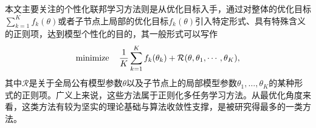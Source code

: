本文主要关注的个性化联邦学习方法则是从优化目标入手，通过对整体的优化目标$\sum\limits_{k=1}^K f_k(\theta)$或者子节点上局部的优化目标$f_k(\theta)$引入特定形式、具有特殊含义的正则项，达到模型个性化的目的\cite{hanzely2020federated,t2020pfedme,deng2020_apfl,dinh2021fedu,li2021pfedmac,li_2021_ditto,acar2021feddyn}，其一般形式可以写作
\begin{equation}
\label{eq:pfl-general}
\operatorname*{minimize} \quad \frac{1}{K}\sum\limits_{k=1}^K f_k(\theta_k) + \mathcal{R}(\theta, \theta_1, \cdots, \theta_K),
\end{equation}
其中$\mathcal{R}$是关于全局公有模型参数$\theta$以及子节点上的局部模型参数$\theta_1, \ldots, \theta_K$的某种形式的正则项。广义上来说，这些方法属于正则化多任务学习方法\cite{Caruana_1997_mtl, evgeniou2004regularized}。从最优化角度来看，这类方法有较为坚实的理论基础与算法收敛性支撑，是被研究得最多的一类方法。
